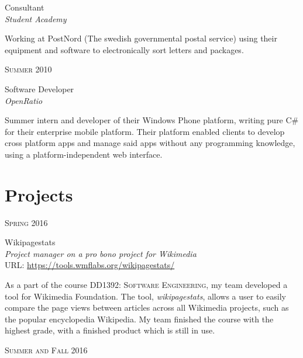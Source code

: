 \documentclass[10pt]{article} %
\begin{document}
{\begin{minipage}[t]{0.5\textwidth}
{\raggedright\large Consultant\\ \textit{Student Academy}\\[5pt]}

    \normalsize{Working at PostNord (The swedish governmental postal service) using their equipment and software to electronically sort letters and packages.}\\


{\raggedleft\textsc{Summer 2010}\par}

{\raggedright\large  Software Developer\\ \textit{OpenRatio}\\[5pt]}

\normalsize{Summer intern and developer of their Windows Phone platform, writing pure C\# for their enterprise mobile platform. Their platform enabled clients to develop cross platform apps and manage said apps without any programming knowledge, using a platform-independent web interface.}\\

\section{Projects}

{\raggedleft\textsc{Spring 2016}\par}

{\raggedright\large Wikipagestats\\ \textit{Project manager on a pro bono project for
    Wikimedia}  \\ \small URL:
    \href{https://tools.wmflabs.org/wikipagestats/}{https://tools.wmflabs.org/wikipagestats/} \\[5pt]}

\normalsize{As a part of the course \textsc{DD1392: Software
    Engineering}, my team developed a tool for Wikimedia Foundation. The tool, \textit{wikipagestats},
    allows a user to easily compare the page views between articles across
    all Wikimedia projects, such as the popular encyclopedia Wikipedia. My team
    finished the course with the highest grade, with a finished product which
    is still in use. }\\

{\raggedleft\textsc{Summer and Fall 2016}\par}


\end{minipage}}
\end{document}
